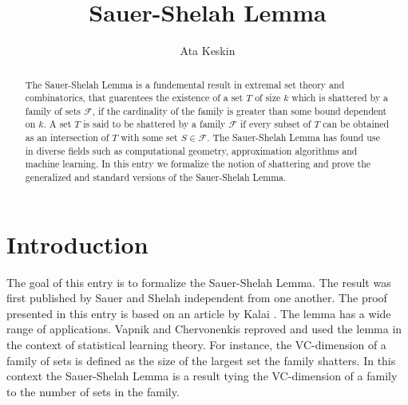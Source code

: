 \documentclass[11pt,a4paper]{article}
\begin{document}
\title{Sauer-Shelah Lemma}
\author{Ata Keskin}
\maketitle

\begin{abstract}
	The Sauer-Shelah Lemma is a fundemental result in extremal set theory and combinatorics, that guarentees the existence of a set $T$ of size $k$
	which is shattered by a family of sets $\mathcal{F}$, if the cardinality of the family is greater than some bound dependent on $k$. A set $T$ is
	said to be shattered by a family $\mathcal{F}$ if every subset of $T$ can be obtained as an intersection of $T$ with some set $S \in \mathcal{F}$.
	The Sauer-Shelah Lemma has found use in diverse fields such as computational geometry, approximation algorithms and machine learning. In this entry
	we formalize the notion of shattering and prove the generalized and standard versions of the Sauer-Shelah Lemma. 
\end{abstract}

\tableofcontents

\section{Introduction}

The goal of this entry is to formalize the Sauer-Shelah Lemma. The result was first published by Sauer \cite{SAUER1972145} and Shelah \cite{pjm/1102968432} independent from one another. The proof presented in this entry is based on an article by Kalai \cite{kalai_2008}. The lemma has a wide range of applications. Vapnik and Chervonenkis \cite{MR0288823} reproved and used the lemma in the context of statistical learning theory. For instance, the VC-dimension of a family of sets is defined as the size of the largest set the family shatters. In this context the Sauer-Shelah Lemma is a result tying the VC-dimension of a family to the number of sets in the family. 






\end{document}
